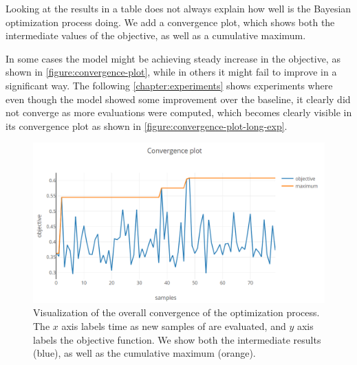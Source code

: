 Looking at the results in a table does not always explain how well is the Bayesian optimization process doing. We add a convergence plot, which shows both the intermediate values of the objective, as well as a cumulative maximum. 

In some cases the model might be achieving steady increase in the objective, as shown in \autoref{figure:convergence-plot}, while in others it might fail to improve in a significant way. The following \autoref{chapter:experiments} shows experiments where even though the model showed some improvement over the baseline, it clearly did not converge as more evaluations were computed, which becomes clearly visible in its convergence plot as shown in \autoref{figure:convergence-plot-long-exp}.

\begin{figure}
	\begin{center}
		\includegraphics[width=1.0\textwidth]{images/convergence-plot.png}
		\caption{Visualization of the overall convergence of the optimization process. The $x$ axis labels time as new samples of are evaluated, and $y$ axis labels the objective function. We show both the intermediate results (blue), as well as the cumulative maximum (orange).}
	\end{center}
\end{figure}
\label{figure:convergence-plot}

